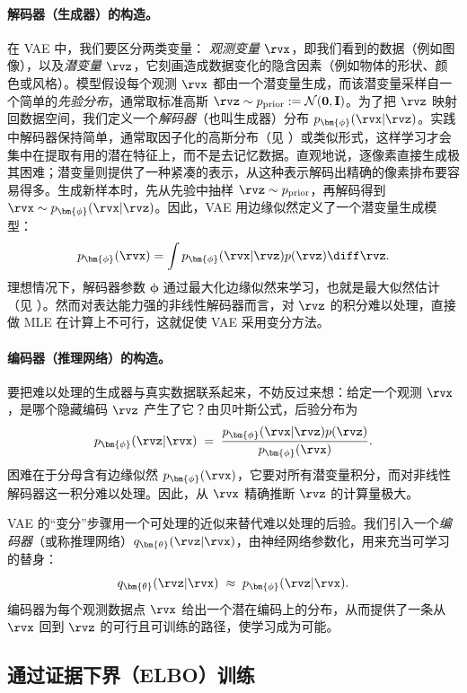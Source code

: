 \paragraph{解码器（生成器）的构造。}


在 VAE 中，我们要区分两类变量：
\emph{观测变量} $\rvx$，即我们看到的数据（例如图像），以及\emph{潜变量} $\rvz$，它刻画造成数据变化的隐含因素（例如物体的形状、颜色或风格）。模型假设每个观测 $\rvx$ 都由一个潜变量生成，而该潜变量采样自一个简单的\emph{先验分布}，通常取标准高斯
$\rvz \sim p_{\text{prior}} := \mathcal{N}(\mathbf{0}, \mathbf{I})$。为了把 $\rvz$ 映射回数据空间，我们定义一个\emph{解码器}（也叫生成器）分布
$p_{\bm{\phi}}(\rvx|\rvz)$。实践中解码器保持简单，通常取因子化的高斯分布（见 ）或类似形式，这样学习才会集中在提取有用的潜在特征上，而不是去记忆数据。直观地说，逐像素直接生成极其困难；潜变量则提供了一种紧凑的表示，从这种表示解码出精确的像素排布要容易得多。生成新样本时，先从先验中抽样 $\rvz \sim p_{\text{prior}}$，再解码得到 $\rvx \sim p_{\bm{\phi}}(\rvx|\rvz)$。因此，VAE 用边缘似然定义了一个潜变量生成模型：
\[
p_{\bm{\phi}}(\rvx) = \int p_{\bm{\phi}}(\rvx|\rvz) p(\rvz) \diff \rvz.
\]
理想情况下，解码器参数 $\bm{\phi}$ 通过最大化边缘似然来学习，也就是最大似然估计（见 ）。然而对表达能力强的非线性解码器而言，对 $\rvz$ 的积分难以处理，直接做 MLE 在计算上不可行，这就促使 VAE 采用变分方法。

\paragraph{编码器（推理网络）的构造。}


要把难以处理的生成器与真实数据联系起来，不妨反过来想：给定一个观测 $\rvx$，是哪个隐藏编码 $\rvz$ 产生了它？由贝叶斯公式，后验分布为
\[
p_{\bm{\phi}}(\rvz|\rvx) \;=\; \frac{p_{\bm{\phi}}(\rvx|\rvz) p(\rvz)}{p_{\bm{\phi}}(\rvx)}.
\]
困难在于分母含有边缘似然 $p_{\bm{\phi}}(\rvx)$，它要对所有潜变量积分，而对非线性解码器这一积分难以处理。因此，从 $\rvx$ 精确推断 $\rvz$ 的计算量极大。

VAE 的“变分”步骤用一个可处理的近似来替代难以处理的后验。我们引入一个\emph{编码器}（或称推理网络）$q_{\bm{\theta}}(\rvz|\rvx)$，由神经网络参数化，用来充当可学习的替身：
\[
q_{\bm{\theta}}(\rvz|\rvx) \;\approx\; p_{\bm{\phi}}(\rvz|\rvx).
\]
编码器为每个观测数据点 $\rvx$ 给出一个潜在编码上的分布，从而提供了一条从 $\rvx$ 回到 $\rvz$ 的可行且可训练的路径，使学习成为可能。

\subsection{通过证据下界（ELBO）训练}

